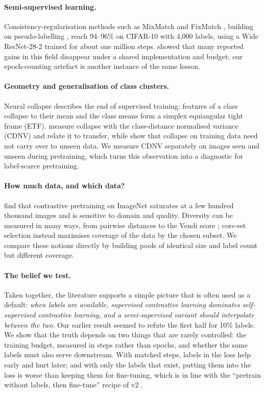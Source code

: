 \paragraph{Semi-supervised learning.}
Consistency-regularisation methods such as MixMatch \citep{berthelot2019mixmatch} and FixMatch
\citep{sohn2020fixmatch}, building on pseudo-labelling \citep{lee2013pseudo}, reach 94--96\% on CIFAR-10 with
4,000 labels, using a Wide ResNet-28-2 \citep{zagoruyko2016wrn} trained for about one million steps.
\citet{oliver2018realistic} showed that many reported gains in this field disappear under a shared
implementation and budget; our epoch-counting artefact is another instance of the same lesson.

\paragraph{Geometry and generalisation of class clusters.}
Neural collapse \citep{papyan2020neural} describes the end of supervised training: features of a class
collapse to their mean and the class means form a simplex equiangular tight frame (ETF).
\citet{galanti2022role} measure collapse with the class-distance normalised variance (CDNV) and relate it
to transfer, while \citet{hui2022limitations} show that collapse on training data need not carry over to
unseen data. We measure CDNV separately on images seen and unseen during pretraining, which turns this
observation into a diagnostic for label-scarce pretraining.

\paragraph{How much data, and which data?}
\citet{cole2022when} find that contrastive pretraining on ImageNet saturates at a few hundred thousand
images and is sensitive to domain and quality. Diversity can be measured in many ways, from pairwise
distances to the Vendi score \citep{friedman2023vendi}; core-set selection \citep{sener2018coreset} instead
maximises coverage of the data by the chosen subset. We compare these notions directly by building pools of
identical size and label count but different coverage.

\paragraph{The belief we test.}
Taken together, the literature supports a simple picture that is often used as a default:
\emph{when labels are available, supervised contrastive learning dominates self-supervised contrastive
learning, and a semi-supervised variant should interpolate between the two}. Our earlier result seemed to
refute the first half for 10\% labels. We show that the truth depends on two things that are rarely
controlled: the training budget, measured in steps rather than epochs, and whether the same labels must also
serve downstream. With matched steps, labels in the loss help early and hurt later; and with only the labels
that exist, putting them into the loss is worse than keeping them for fine-tuning, which is in line with the
``pretrain without labels, then fine-tune'' recipe of \simclr v2 \citep{chen2020simclrv2}.
